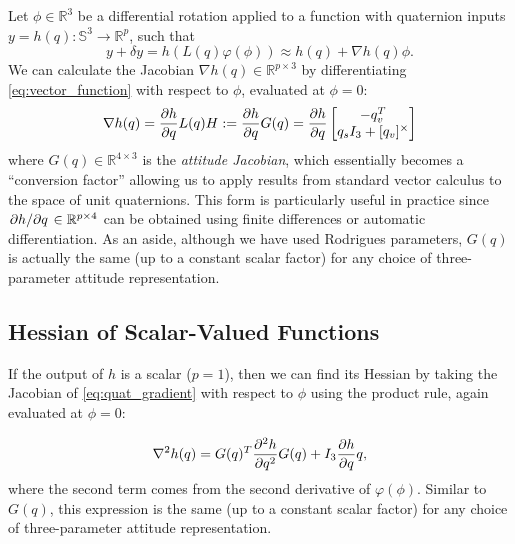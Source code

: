 \documentclass[letterpaper, 10 pt, conference]{ieeeconf}  %
\newcommand{\R}{\mathbb{R}}
\newcommand{\Q}{\mathbb{S}^3}
\newcommand{\skewmat}[1]{[#1]^\times}
\begin{document}
        Let $\phi \in \R^3$ be a differential rotation applied to a function with
        quaternion inputs $y = h(q): \Q \to \R^p$, such that
        \begin{equation} \label{eq:vector_function}
            y + \delta y = h(L(q) \varphi(\phi)) \approx h(q) +  \nabla h(q) \phi.
        \end{equation}
        We can calculate the Jacobian $\nabla h(q) \in \R^{p \times 3}$ by
        differentiating \eqref{eq:vector_function} with respect to $\phi$, evaluated at
        $\phi = 0$:
        \begin{equation} \label{eq:quat_gradient}
            \nabla h(q) = \pdv{h}{q} L(q) H := \pdv{h}{q} G(q) 
                        = \pdv{h}{q} \begin{bmatrix} 
                            -q_v^T \\ 
                            q_s I_3 + \skewmat{q_v}
                        \end{bmatrix}
        \end{equation}
        where $G(q) \in \R^{4 \times 3}$ is the \textit{attitude Jacobian}, which
        essentially becomes a ``conversion factor'' allowing us to apply results from
        standard vector calculus to the space of unit quaternions. This form is
        particularly useful in practice since $\pdv*{h}{q} \in \R^{p \times 4}$ can be
        obtained using finite differences or automatic differentiation.
        As an aside, although we have used Rodrigues parameters, $G(q)$ is actually the
        same (up to a constant scalar factor) for any choice of three-parameter attitude
        representation.

    \subsection{Hessian of Scalar-Valued Functions}
	    If the output of $h$ is a scalar ($p = 1$), then we can find its Hessian by
	    taking the Jacobian of \eqref{eq:quat_gradient} with respect to $\phi$ using the
        product rule, again evaluated at $\phi = 0$:

	    \begin{equation} \label{eq:quat_hessian}
            \nabla^2 h(q) = G(q)^T \pdv[2]{h}{q} G(q) + I_3 \pdv{h}{q}q,
	    \end{equation}
	    where the second term comes from the second derivative of $\varphi(\phi)$.
	    Similar to $G(q)$, this expression is the same (up to a constant scalar factor) for any
        choice of three-parameter attitude representation.
        
\end{document}

